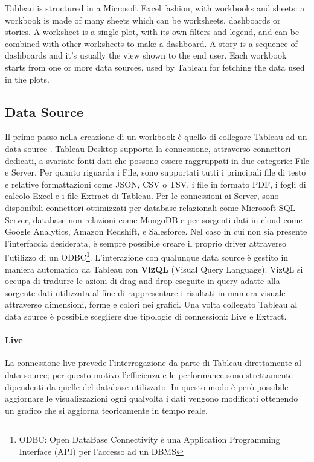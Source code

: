 Tableau is structured in a Microsoft Excel fashion, with workbooks and sheets: a workbook is made of many sheets which can be worksheets, dashboards or stories. A worksheet is a single plot, with its own filters and legend, and can be combined with other worksheets to make a dashboard. A story is a sequence of dashboards and it's usually the view shown to the end user. Each workbook starts from one or more data sources, used by Tableau for fetching the data used in the plots.

\subsection{Data Source}

Il primo passo nella creazione di un workbook è quello di collegare Tableau ad un data source \cite{data_tableau}. Tableau Desktop supporta la connessione, attraverso connettori dedicati, a svariate fonti dati che possono essere raggruppati in due categorie: File e Server. Per quanto riguarda i File, sono supportati tutti i principali file di testo e relative formattazioni come JSON, CSV o TSV, i file in formato PDF, i fogli di calcolo Excel e i file Extract di Tableau. Per le connessioni ai Server, sono disponibili connettori ottimizzati per database relazionali come Microsoft SQL Server, database non relazioni come MongoDB e per sorgenti dati in cloud come Google Analytics, Amazon Redshift, e Salesforce. Nel caso in cui non sia presente l'interfaccia desiderata, è sempre possibile creare il proprio driver attraverso l'utilizzo di un ODBC\footnote{ODBC: Open DataBase Connectivity è una Application Programming Interface (API) per l'accesso ad un DBMS}. L'interazione con qualunque data source è gestito in maniera automatica da Tableau con \textbf{VizQL} (Visual Query Language). VizQL si occupa di tradurre le azioni di drag-and-drop eseguite in query adatte alla sorgente dati utilizzata al fine di rappresentare i risultati in maniera visuale attraverso dimensioni, forme e colori nei grafici. Una volta collegato Tableau al data source è possibile scegliere due tipologie di connessioni: Live e Extract.

\paragraph{Live}

La connessione live prevede l'interrogazione da parte di Tableau direttamente al data source; per questo motivo l'efficienza e le performance sono strettamente dipendenti da quelle del database utilizzato. In questo modo è però possibile aggiornare le visualizzazioni ogni qualvolta i dati vengono modificati ottenendo un grafico che si aggiorna teoricamente in tempo reale.

